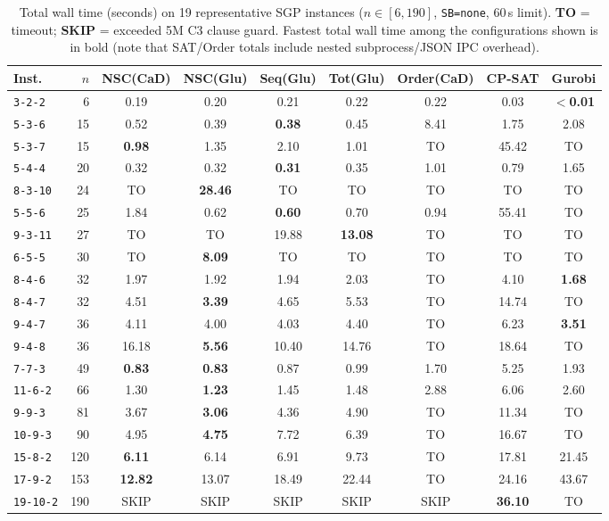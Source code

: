 \documentclass[a4paper,fleqn]{cas-sc}
\begin{document}
\begin{table}[pos=!htb]
\centering\footnotesize
\setlength{\tabcolsep}{3.5pt}
\caption{Total wall time (seconds) on 19 representative SGP instances ($n \in [6, 190]$, \texttt{SB=none}, 60\,s limit). \textbf{TO} = timeout; \textbf{SKIP} = exceeded 5M C3 clause guard. Fastest total wall time among the configurations shown is in bold (note that SAT/Order totals include nested subprocess/JSON IPC overhead).}
\label{tab:representative_instances}
\begin{tabular}{lrccccccc}
\toprule
\textbf{Inst.} & $n$ & \textbf{NSC(CaD)} & \textbf{NSC(Glu)} & \textbf{Seq(Glu)} & \textbf{Tot(Glu)} & \textbf{Order(CaD)} & \textbf{CP-SAT} & \textbf{Gurobi} \\
\midrule
\texttt{3-2-2} & 6 & 0.19 & 0.20 & 0.21 & 0.22 & 0.22 & 0.03 & \textbf{$<$0.01} \\
\texttt{5-3-6} & 15 & 0.52 & 0.39 & \textbf{0.38} & 0.45 & 8.41 & 1.75 & 2.08 \\
\texttt{5-3-7} & 15 & \textbf{0.98} & 1.35 & 2.10 & 1.01 & TO & 45.42 & TO \\
\texttt{5-4-4} & 20 & 0.32 & 0.32 & \textbf{0.31} & 0.35 & 1.01 & 0.79 & 1.65 \\
\texttt{8-3-10} & 24 & TO & \textbf{28.46} & TO & TO & TO & TO & TO \\
\texttt{5-5-6} & 25 & 1.84 & 0.62 & \textbf{0.60} & 0.70 & 0.94 & 55.41 & TO \\
\texttt{9-3-11} & 27 & TO & TO & 19.88 & \textbf{13.08} & TO & TO & TO \\
\texttt{6-5-5} & 30 & TO & \textbf{8.09} & TO & TO & TO & TO & TO \\
\texttt{8-4-6} & 32 & 1.97 & 1.92 & 1.94 & 2.03 & TO & 4.10 & \textbf{1.68} \\
\texttt{8-4-7} & 32 & 4.51 & \textbf{3.39} & 4.65 & 5.53 & TO & 14.74 & TO \\
\texttt{9-4-7} & 36 & 4.11 & 4.00 & 4.03 & 4.40 & TO & 6.23 & \textbf{3.51} \\
\texttt{9-4-8} & 36 & 16.18 & \textbf{5.56} & 10.40 & 14.76 & TO & 18.64 & TO \\
\texttt{7-7-3} & 49 & \textbf{0.83} & \textbf{0.83} & 0.87 & 0.99 & 1.70 & 5.25 & 1.93 \\
\texttt{11-6-2} & 66 & 1.30 & \textbf{1.23} & 1.45 & 1.48 & 2.88 & 6.06 & 2.60 \\
\texttt{9-9-3} & 81 & 3.67 & \textbf{3.06} & 4.36 & 4.90 & TO & 11.34 & TO \\
\texttt{10-9-3} & 90 & 4.95 & \textbf{4.75} & 7.72 & 6.39 & TO & 16.67 & TO \\
\texttt{15-8-2} & 120 & \textbf{6.11} & 6.14 & 6.91 & 9.73 & TO & 17.81 & 21.45 \\
\texttt{17-9-2} & 153 & \textbf{12.82} & 13.07 & 18.49 & 22.44 & TO & 24.16 & 43.67 \\
\texttt{19-10-2} & 190 & SKIP & SKIP & SKIP & SKIP & SKIP & \textbf{36.10} & TO \\
\bottomrule
\end{tabular}
\end{table}
\end{document}
